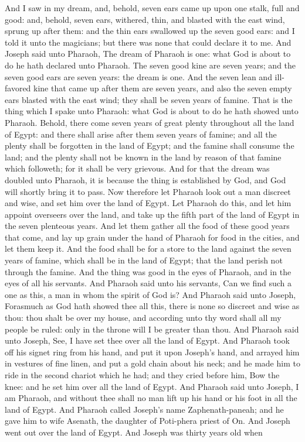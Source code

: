And I saw in my dream, and, behold, seven ears came up upon one stalk, full and good: and, behold, seven ears, withered, thin, and blasted with the east wind, sprung up after them: and the thin ears swallowed up the seven good ears: and I told it unto the magicians; but there was none that could declare it to me.  And Joseph said unto Pharaoh, The dream of Pharaoh is one: what God is about to do he hath declared unto Pharaoh. The seven good kine are seven years; and the seven good ears are seven years: the dream is one. And the seven lean and ill-favored kine that came up after them are seven years, and also the seven empty ears blasted with the east wind; they shall be seven years of famine. That is the thing which I spake unto Pharaoh: what God is about to do he hath showed unto Pharaoh. Behold, there come seven years of great plenty throughout all the land of Egypt: and there shall arise after them seven years of famine; and all the plenty shall be forgotten in the land of Egypt; and the famine shall consume the land; and the plenty shall not be known in the land by reason of that famine which followeth; for it shall be very grievous. And for that the dream was doubled unto Pharaoh, it is because the thing is established by God, and God will shortly bring it to pass. Now therefore let Pharaoh look out a man discreet and wise, and set him over the land of Egypt. Let Pharaoh do this, and let him appoint overseers over the land, and take up the fifth part of the land of Egypt in the seven plenteous years. And let them gather all the food of these good years that come, and lay up grain under the hand of Pharaoh for food in the cities, and let them keep it. And the food shall be for a store to the land against the seven years of famine, which shall be in the land of Egypt; that the land perish not through the famine.  And the thing was good in the eyes of Pharaoh, and in the eyes of all his servants. And Pharaoh said unto his servants, Can we find such a one as this, a man in whom the spirit of God is? And Pharaoh said unto Joseph, Forasmuch as God hath showed thee all this, there is none so discreet and wise as thou: thou shalt be over my house, and according unto thy word shall all my people be ruled: only in the throne will I be greater than thou. And Pharaoh said unto Joseph, See, I have set thee over all the land of Egypt. And Pharaoh took off his signet ring from his hand, and put it upon Joseph’s hand, and arrayed him in vestures of fine linen, and put a gold chain about his neck; and he made him to ride in the second chariot which he had; and they cried before him, Bow the knee: and he set him over all the land of Egypt. And Pharaoh said unto Joseph, I am Pharaoh, and without thee shall no man lift up his hand or his foot in all the land of Egypt. And Pharaoh called Joseph’s name Zaphenath-paneah; and he gave him to wife Asenath, the daughter of Poti-phera priest of On. And Joseph went out over the land of Egypt.  And Joseph was thirty years old when 